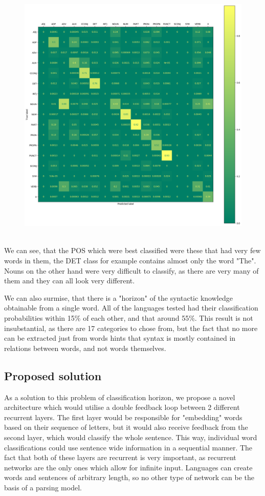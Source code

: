 \begin{figure}[h!]
        \centering
        \includegraphics[width=0.5\linewidth]{TOPO/CONF_TOPO_2.png}
\end{figure}\\

We can see, that the POS which were best classified were these that had very few words in them, the DET class for example contains almost only the word "The". Nouns on the other hand were very difficult to classify, as there are very many of them and they can all look very different. 

We can also surmise, that there is a "horizon" of the syntactic knowledge obtainable from a single word. All of the languages tested had their classification probabilities within 15\% of each other, and that around 55\%. This result is not insubstantial, as there are 17 categories to chose from, but the fact that no more can
be extracted just from words hints that syntax is mostly contained in relations between words, and not words themselves.
\subsection{Proposed solution}
As a solution to this problem of classification horizon, we propose a novel architecture which would utilise a double feedback loop between 2 different recurrent layers. The first layer would be responsible for "embedding" words based on their sequence of letters, but it would also receive feedback from the second layer, which
would classify the whole sentence. This way, individual word classifications could use sentence wide information in a sequential manner. The fact that both of these layers are recurrent is very important, as recurrent networks are the only ones which allow for infinite input. Languages can create words and sentences of arbitrary length, so no other type of network can be the basis of a parsing model.

